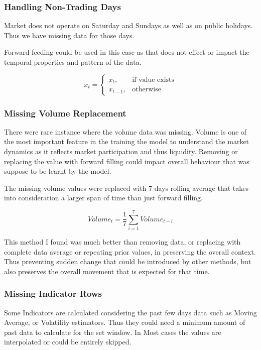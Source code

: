 \subsubsection{Handling Non-Trading Days}

Market does not operate on Saturday and Sundays as well as on public holidays. Thus we have missing data for those days.

Forward feeding could be used in this case as that does not effect or impact the temporal properties and pattern of the data.

\begin{equation}
x_t =
\begin{cases}
x_{t}, & \text{if value exists} \\
x_{t-1}, & \text{otherwise}
\end{cases}
\end{equation}

\subsubsection{Missing Volume Replacement}

There were rare instance where the volume data was missing. Volume is one of the most important feature in the training the model to understand the market dynamics as it reflects market participation and thus liquidity. Removing or replacing the value with forward filling could impact overall behaviour that was suppose to be learnt by the model.

The missing volume values were replaced with 7 days rolling average that takes into consideration a larger span of time than just forward filling.

\begin{equation}
Volume_t = \frac{1}{7} \sum_{i=1}^{7} Volume_{t-i}
\end{equation}

This method I found was much better than removing data, or replacing with complete data average or repeating prior values, in preserving the overall context. Thus preventing sudden change that could be introduced by other methods, but also preserves the overall movement that is expected for that time.

\subsubsection{Missing Indicator Rows}

Some Indicators are calculated considering the past few days data such as Moving Average, or Volatility estimators. Thus they could need a minimum amount of past data to calculate for the set window. In Most cases the values are interpolated or could be entirely skipped.

